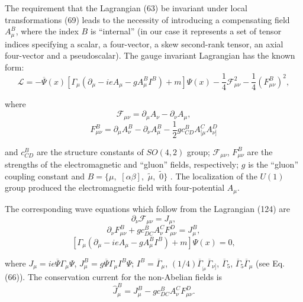 \documentclass[a4paper,12pt]{article}
\begin{document}
The requirement that the Lagrangian (63) be invariant under local
transformations (69) leads to the necessity of introducing a
compensating field $A_\mu ^B$, where the index $B$ is ``internal''
(in our case it represents a set of tensor indices specifying a
scalar, a four-vector, a skew second-rank tensor, an axial
four-vector and a pseudoscalar). The gauge invariant Lagrangian
has the known form:
\begin{equation}
\mathcal{L}=-\overline{\Psi }(x)\left[ \Gamma _\mu \left( \partial
_\mu -ieA_\mu -gA_\mu ^BI^B\right) +m\right] \Psi (x)-\frac
14\mathcal{F}_{\mu \nu }^2-\frac 14\left( F_{\mu \nu }^B\right) ^2
, \label{124}
\end{equation}

where
\[
\mathcal{F}_{\mu \nu }=\partial _\mu A_\nu -\partial _\nu A_\mu ,
\]
\vspace{-8mm}
\begin{equation}  \label{125}
\end{equation}
\vspace{-8mm}
\[
F_{\mu \nu }^B=\partial _\mu A_\nu ^B-\partial _\nu A_\mu ^B-\frac
12gc_{CD}^BA_{[\mu }^CA_{\nu ]}^D
\]

and $c_{CD}^B$ are the structure constants of $SO(4,2)$ group;
$\mathcal{F} _{\mu \nu }$, $F_{\mu \nu }^B$ are the strengths of
the electromagnetic and ``gluon'' fields, respectively; $g$ is the
``gluon'' coupling constant and $ B=\{\mu ,$ $[\alpha \beta ],$
$\widetilde{\mu },$ $\widetilde{0}\}$ . The localization of the
$U(1)$ group produced the electromagnetic field with
four-potential $A_\mu $.

The corresponding wave equations which follow from the Lagrangian
(124) are
\begin{equation}
\partial _\nu \mathcal{F}_{\mu \nu }=J_\mu  , \label{126}
\end{equation}
\begin{equation}
\partial _\nu F_{\mu \nu }^B+gc_{DC}^BA_\nu ^CF_{\mu \nu }^D=J_\mu
^B ,\label{127}
\end{equation}
\begin{equation}
\left[ \Gamma _\mu \left( \partial _\mu -ieA_\mu -gA_\mu
^BI^B\right) +m\right] \Psi (x)=0  ,\label{128}
\end{equation}

where $J_\mu =ie\overline{\Psi }\Gamma _\mu \Psi $, $J_\mu
^B=g\overline{\Psi }\Gamma _\mu I^B\Psi $; $I^B=\overline{\Gamma
}_\mu $, $(1/4)\overline{ \Gamma }_{_{[\mu }}\overline{\Gamma
}_{\nu ]}$, $\overline{\Gamma }_5$, $ \overline{\Gamma
}_5\overline{\Gamma }_\mu $ (see Eq. (66)). The conservation
current for the non-Abelian fields is
\begin{equation}
\widehat{J}_\mu ^B=J_\mu ^B-gc_{DC}^BA_\nu ^CF_{\mu \nu }^D .
\label{129}
\end{equation}
\end{document}
